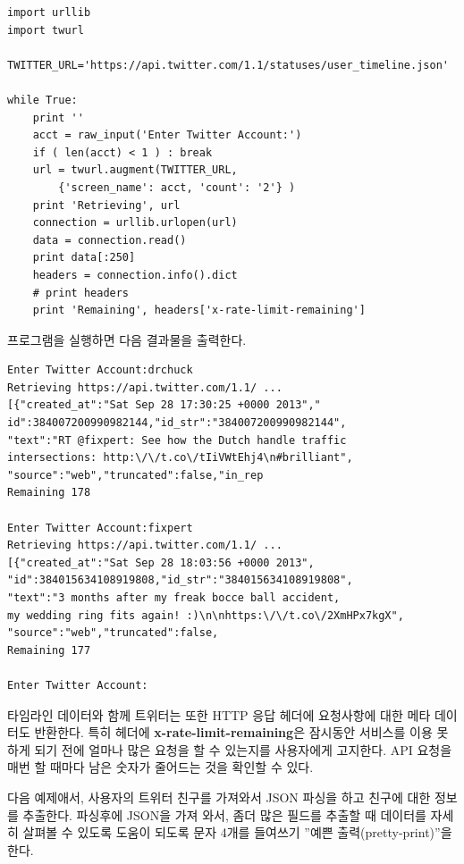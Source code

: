 \beforeverb
\begin{verbatim}
import urllib
import twurl

TWITTER_URL='https://api.twitter.com/1.1/statuses/user_timeline.json'

while True:
    print ''
    acct = raw_input('Enter Twitter Account:')
    if ( len(acct) < 1 ) : break
    url = twurl.augment(TWITTER_URL,
        {'screen_name': acct, 'count': '2'} )
    print 'Retrieving', url
    connection = urllib.urlopen(url)
    data = connection.read()
    print data[:250]
    headers = connection.info().dict
    # print headers
    print 'Remaining', headers['x-rate-limit-remaining']
\end{verbatim}
\afterverb
%

프로그램을 실행하면 다음 결과물을 출력한다.

\beforeverb
\begin{verbatim}
Enter Twitter Account:drchuck
Retrieving https://api.twitter.com/1.1/ ...
[{"created_at":"Sat Sep 28 17:30:25 +0000 2013","
id":384007200990982144,"id_str":"384007200990982144",
"text":"RT @fixpert: See how the Dutch handle traffic 
intersections: http:\/\/t.co\/tIiVWtEhj4\n#brilliant",
"source":"web","truncated":false,"in_rep
Remaining 178

Enter Twitter Account:fixpert
Retrieving https://api.twitter.com/1.1/ ...
[{"created_at":"Sat Sep 28 18:03:56 +0000 2013",
"id":384015634108919808,"id_str":"384015634108919808",
"text":"3 months after my freak bocce ball accident, 
my wedding ring fits again! :)\n\nhttps:\/\/t.co\/2XmHPx7kgX",
"source":"web","truncated":false,
Remaining 177

Enter Twitter Account:
\end{verbatim}
\afterverb
%

타임라인 데이터와 함께 트위터는 또한 HTTP 응답 헤더에 요청사항에 대한 메타 데이터도 반환한다.
특히 헤더에  {\bf x-rate-limit-remaining}은 잠시동안 서비스를 이용 못하게 되기 전에 얼마나 많은 요청을 할 수 있는지를 사용자에게 고지한다. API 요청을 매번 할 때마다 남은 숫자가 줄어드는 것을 확인할 수 있다.

다음 예제애서, 사용자의 트위터 친구를 가져와서 JSON 파싱을 하고 친구에 대한 정보를 추출한다.
파싱후에 JSON을 가져 와서, 좀더 많은 필드를 추출할 때 데이터를 자세히 살펴볼 수 있도록 도움이 되도록 문자 4개를 들여쓰기 ''예쁜 출력(pretty-print)''을 한다.

